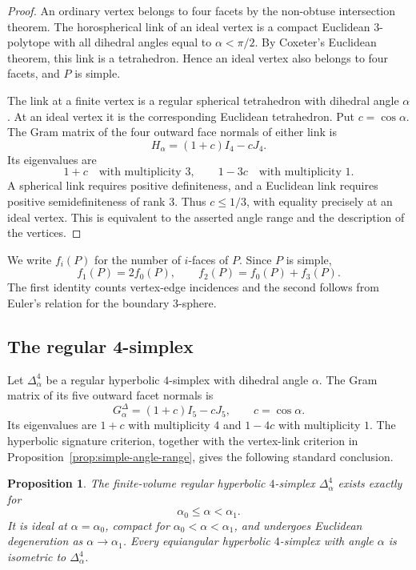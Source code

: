 \documentclass[12pt,a4paper]{article}
\theoremstyle{thmstyleone}
\newtheorem{proposition}[theorem]{Proposition}
\theoremstyle{thmstylethree}
\theoremstyle{thmstyletwo}
\begin{document}
\begin{proof}
An ordinary vertex belongs to four facets by the non-obtuse intersection
theorem.  The horospherical link of an ideal vertex is a compact Euclidean
$3$-polytope with all dihedral angles equal to $\alpha<\pi/2$.  By Coxeter's
Euclidean theorem, this link is a tetrahedron.  Hence an ideal vertex also
belongs to four facets, and $P$ is simple.

The link at a finite vertex is a regular spherical tetrahedron with dihedral
angle $\alpha$.  At an ideal vertex it is the corresponding Euclidean
tetrahedron.  Put $c=\cos\alpha$.  The Gram matrix of the four outward face
normals of either link is
\begin{equation}\label{eq:link-Gram}
 H_\alpha=(1+c)I_4-cJ_4.
\end{equation}
Its eigenvalues are
\[
 1+c\quad\text{with multiplicity }3,
 \qquad
 1-3c\quad\text{with multiplicity }1.
\]
A spherical link requires positive definiteness, and a Euclidean link
requires positive semidefiniteness of rank $3$.  Thus $c\leq1/3$, with
equality precisely at an ideal vertex.  This is equivalent to the asserted
angle range and the description of the vertices.
\end{proof}

We write $f_i(P)$ for the number of $i$-faces of $P$.  Since $P$ is simple,
\begin{equation}\label{eq:simple-f-relations}
 f_1(P)=2f_0(P),
 \qquad
 f_2(P)=f_0(P)+f_3(P).
\end{equation}
The first identity counts vertex-edge incidences and the second follows from
Euler's relation for the boundary $3$-sphere.

\subsection{The regular 4-simplex}

Let $\Delta^4_\alpha$ be a regular hyperbolic $4$-simplex with dihedral angle
$\alpha$.  The Gram matrix of its five outward facet normals is
\begin{equation}\label{eq:simplex-Gram}
 G^\Delta_\alpha=(1+c)I_5-cJ_5,
 \qquad c=\cos\alpha.
\end{equation}
Its eigenvalues are $1+c$ with multiplicity $4$ and $1-4c$ with
multiplicity $1$.  The hyperbolic signature criterion, together with the
vertex-link criterion in Proposition~\ref{prop:simple-angle-range}, gives the
following standard conclusion.

\begin{proposition}\label{prop:simplex-existence}
The finite-volume regular hyperbolic $4$-simplex $\Delta^4_\alpha$ exists
exactly for
\[
 \alpha_0\leq\alpha<\alpha_1.
\]
It is ideal at $\alpha=\alpha_0$, compact for
$\alpha_0<\alpha<\alpha_1$, and undergoes Euclidean degeneration as
$\alpha\to\alpha_1$.  Every equiangular hyperbolic $4$-simplex with angle
$\alpha$ is isometric to $\Delta^4_\alpha$.
\end{proposition}
\end{document}
